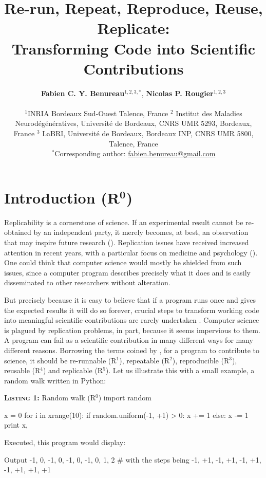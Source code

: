 \documentclass[a4paper,11pt]{article}
\title{Re-run, Repeat, Reproduce, Reuse, Replicate:\\Transforming Code into Scientific Contributions}
\author{
  \textbf{Fabien C. Y. Benureau}$^{1,2,3,*}$,
  \textbf{Nicolas P. Rougier}$^{1,2,3}$\\ \begin{minipage}{\textwidth}
    \begin{center}
      \vspace{2mm}
      $^{1}$INRIA Bordeaux Sud-Ouest Talence, France $^{2}$ Institut des
      Maladies Neurodégénératives, Université de Bordeaux, CNRS UMR 5293,
      Bordeaux, France $^{3}$ LaBRI, Université de Bordeaux, Bordeaux INP, CNRS
      UMR 5800, Talence, France\\
      \vspace{2mm}
      $^{*}$Corresponding author:
      \href{mailto:fabien.benureau@gmail.com}{fabien.benureau@gmail.com}
    \end{center}
  \end{minipage}
}
\date{}
\begin{document}
\maketitle
\section*{Introduction (R$^{\mathbf 0}$)}

Replicability is a cornerstone of science.  If an experimental result cannot be
re-obtained by an independent party, it merely becomes, at best, an observation
that may inspire future research (\cite{Mesirov:2010,osc:2015}). Replication
issues have received increased attention in recent years, with a particular focus on medicine and psychology (\cite{Iqbal:2016}).  One could think
that computer science would mostly be shielded from such issues, since a
computer program describes precisely what it does and is easily
disseminated to other researchers without alteration.

But precisely because it is easy to believe that if a program runs once and
gives the expected results it will do so forever, crucial steps to transform
working code into meaningful scientific contributions are rarely undertaken
\citep{Sandve:2013,Schwab:2000}. Computer science is plagued by replication
problems, in part, because it seems impervious to them. A program can
fail as a scientific contribution in many different ways for many different
reasons. Borrowing the terms coined by \citeauthor{Goble:2016}
\citep{Goble:2016}, for a program to contribute to science, it should be
re-runnable (R$^1$), repeatable (R$^2$), reproducible (R$^3$),
reusable (R$^4$) and replicable (R$^5$). Let us illustrate this with a small
example, a random walk written in Python:\\

\noindent \begin{minipage}[c]{\linewidth}
\begin{code}{\textbf{\textsc{Listing 1:}} Random walk (R$^0$)}
import random

x = 0
for i in xrange(10):
    if random.uniform(-1, +1) > 0:
        x += 1
    else:
        x -= 1
    print x,
\end{code}
\end{minipage}

Executed, this program would display:
\begin{code}{Output}
-1, 0, -1, 0, -1, 0, -1, 0, 1, 2 # with the steps being -1, +1, -1, +1, -1, +1, -1, +1, +1, +1
\end{code}
\end{document}
